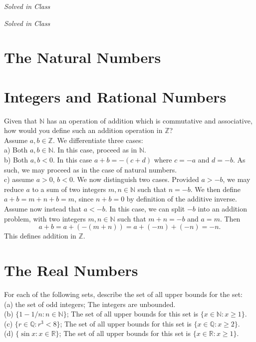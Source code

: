 \documentclass[12pt]{book}
\newcommand{\N}{\mathbb{N}}
\newcommand{\Z}{\mathbb{Z}}
\newenvironment{exercise}[2][Exercise]{\begin{trivlist}
\item[\hskip \labelsep {\bfseries #1}\hskip \labelsep {\bfseries #2.}]}{\end{trivlist}}
\begin{document}
\begin{exercise}{1.1.14}
\emph{Solved in Class}
\end{exercise}

\begin{exercise}{1.1.15}
\emph{Solved in Class}
\end{exercise}


\section{The Natural Numbers}


\section{Integers and Rational Numbers}

\begin{exercise}{1.3.1}
    Given that $\N$ has an operation of addition which is commutative and associative, how would you define such an addition operation in $\Z$?\\

    Assume $a,b \in \Z$. We differentiate three cases: \\
    a) Both $a,b \in \N$. In this case, proceed as in $\N$.\\
    b) Both $a,b < 0$. In this case $a+b= - (c + d)$ where $c= -a$ and $d= -b$. As such, we may proceed as in the case of natural numbers.\\
    c) assume $a>0$, $b<0$. We now distinguish two cases. Provided $a> -b$, we may reduce $a$ to a sum of two integers $m,n \in \N$ such that $n = -b$. We then define $a+b = m + n + b = m$, since $n+b=0$ by definition of the additive inverse. Assume now instead that $a< -b$. In this case, we can split $-b$ into an addition problem, with two integers $m,n \in \N$ such that $m+n= -b$ and $a = m$. Then
    \[ a+b = a + (-(m+n)) = a + (-m) + (-n) = -n.  \]
    This defines addition in $\Z$.
\end{exercise}


\section{The Real Numbers}


\begin{exercise}{1.4.1}
For each of the following sets, describe the set of all upper bounds for the set: \\
(a) the set of odd integers; The integers are unbounded.\\
(b) $\{1 - 1/n : n \in \mathbb{N}\}$; The set of all upper bounds for this set is $\{x \in \mathbb{N}: x \geq 1\}$. \\
(c) $\{r \in \mathbb{Q}: r^3 < 8\}$; The set of all upper bounds for this set is $\{x \in \mathbb{Q}: x \geq 2\}$.\\
(d) $\{ \sin x : x \in \mathbb{R}\}$; The set of all upper bounds for this set is $\{x \in \mathbb{R}: x \geq 1\}$.
\end{exercise}
\end{document}
